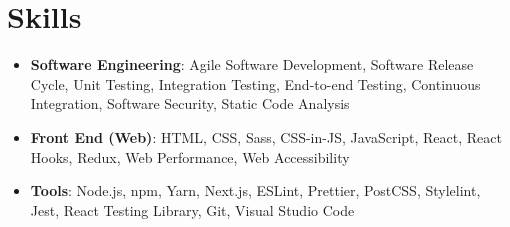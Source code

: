 \documentclass[11pt, a4paper]{article}
\newcommand{\resumeSubHeadingListStart}{\begin{itemize}[leftmargin=*]}
\newcommand{\resumeSubHeadingListEnd}{\end{itemize}}
\begin{document}



\section{Skills}
  \resumeSubHeadingListStart
    \item{
      \textbf{Software Engineering}{: Agile Software Development, Software Release Cycle, Unit Testing, Integration Testing, End-to-end Testing, Continuous Integration, Software Security, Static Code Analysis}
    }
    \item{
      \textbf{Front End (Web)}{: HTML, CSS, Sass, CSS-in-JS, JavaScript, React, React Hooks, Redux, Web Performance, Web Accessibility}
    }
    \item{
      \textbf{Tools}{: Node.js, npm, Yarn, Next.js, ESLint, Prettier, PostCSS, Stylelint, Jest, React Testing Library, Git, Visual Studio Code}
    }
  \resumeSubHeadingListEnd





\end{document}
